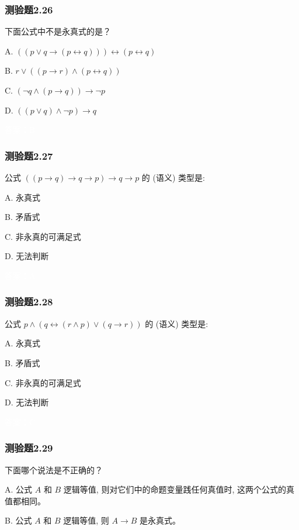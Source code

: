 \documentclass[UTF8, heading=true]{ctexart}
\begin{document}
\subsubsection{测验题2.26}

下面公式中不是永真式的是？

A. $((p \vee q \rightarrow(p \leftrightarrow q))) \leftrightarrow(p \leftrightarrow q)$

B. $ r \vee((p \rightarrow r) \wedge(p \leftrightarrow q))$

C. $(\neg q \wedge(p \rightarrow q)) \rightarrow \neg p$

D. $((p \vee q) \wedge \neg p) \rightarrow q$

\textcolor{white}{答案：B}

\subsubsection{测验题2.27}

公式 $((p \rightarrow q) \rightarrow q \rightarrow p) \rightarrow q \rightarrow p$ 的 (语义) 类型是: $\qquad$

A. 永真式

B. 矛盾式

C. 非永真的可满足式

D. 无法判断

\textcolor{white}{答案：A}

\subsubsection{测验题2.28}

公式 $p \wedge(q \leftrightarrow(r \wedge p) \vee(q \rightarrow r))$ 的 (语义) 类型是: $\qquad$

A. 永真式

B.  矛盾式

C.   非永真的可满足式

D. 无法判断

\textcolor{white}{答案：C}

\subsubsection{测验题2.29}

下面哪个说法是不正确的？

A. 公式 $A$ 和 $B$ 逻辑等值, 则对它们中的命题变量践任何真值时, 这两个公式的真值都相同。

B. 公式 $A$ 和 $B$ 逻辑等值, 则 $A \rightarrow B$ 是永真式。
\end{document}
